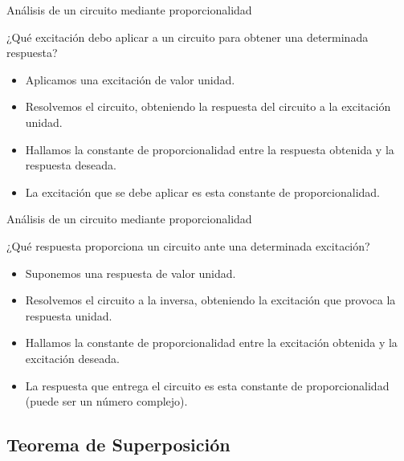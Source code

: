 \documentclass[aspectratio=169, usenames,svgnames,dvipsnames]{beamer}
\begin{document}
\begin{frame}[label={sec:org17ebd7b}]{Análisis de un circuito mediante proporcionalidad}
\begin{block}{¿Qué excitación debo aplicar a un circuito para obtener una determinada respuesta?}
\begin{itemize}
\item Aplicamos una excitación de valor unidad.
\item Resolvemos el circuito, obteniendo la respuesta del circuito a la excitación unidad.
\item Hallamos la constante de proporcionalidad entre la respuesta obtenida y la respuesta deseada.
\item La excitación que se debe aplicar es esta constante de proporcionalidad.
\end{itemize}
\end{block}
\end{frame}

\begin{frame}[label={sec:orgee7e0d8}]{Análisis de un circuito mediante proporcionalidad}
\begin{block}{¿Qué respuesta proporciona un circuito ante una determinada excitación?}
\begin{itemize}
\item Suponemos una respuesta de valor unidad.
\item Resolvemos el circuito a la inversa, obteniendo la excitación que provoca la respuesta unidad.
\item Hallamos la constante de proporcionalidad entre la excitación obtenida y la excitación deseada.
\item La respuesta que entrega el circuito es esta constante de proporcionalidad (puede ser un número complejo).
\end{itemize}
\end{block}
\end{frame}

\subsection{Teorema de Superposición}
\label{sec:org7814bc8}
\end{document}
